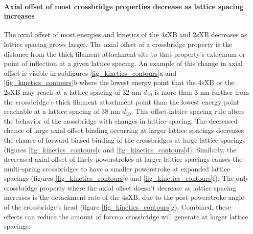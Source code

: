 \documentclass[]{article}
\begin{document}
\paragraph{Axial offset of most crossbridge properties decrease as lattice spacing increases} %
The axial offset of most energies and kinetics of the 4sXB and 2sXB decreases as lattice spacing grows larger.
The axial offset of a crossbridge property is the distance from the thick filament attachment site to that property's extremum or point of inflection at a given lattice spacing. 
An example of this change in axial offset is visible in subfigures \ref{fig_kinetics_contours}a and \ref{fig_kinetics_contours}b where the lowest energy point that the 4sXB or the 2sXB may reach at a lattice spacing of 32 nm $d_{10}$ is more than 3 nm further from the crossbridge's thick filament attachment point than the lowest energy point reachable at a lattice spacing of 38 nm $d_{10}$.
This offset-lattice spacing rule alters the behavior of the crossbridge with changes in lattice-spacing.
The decreased chance of large axial offset binding occurring at larger lattice spacings decreases the chance of forward biased binding of the crossbridges at large lattice spacings (figures \ref{fig_kinetics_contours}c and \ref{fig_kinetics_contours}d).
Similarly, the decreased axial offset of likely powerstrokes at larger lattice spacings causes the multi-spring crossbridges to have a smaller powerstroke at expanded lattice spacings (figures \ref{fig_kinetics_contours}e and \ref{fig_kinetics_contours}f).
The only crossbridge property where the axial offset doesn't decrease as lattice spacing increases is the detachment rate of the 4sXB, due to the post-powerstroke angle of the crossbridge's head (figure \ref{fig_kinetics_contours}g).
Combined, these effects can reduce the amount of force a crossbridge will generate at larger lattice spacings.
\end{document}
